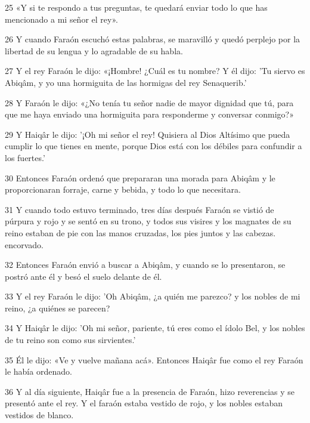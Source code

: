 \par 25 «Y si te respondo a tus preguntas, te quedará enviar todo lo que has mencionado a mi señor el rey».

\par 26 Y cuando Faraón escuchó estas palabras, se maravilló y quedó perplejo por la libertad de su lengua y lo agradable de su habla.

\par 27 Y el rey Faraón le dijo: «¡Hombre! ¿Cuál es tu nombre? Y él dijo: 'Tu siervo es Abiqâm, y yo una hormiguita de las hormigas del rey Senaquerib.'

\par 28 Y Faraón le dijo: «¿No tenía tu señor nadie de mayor dignidad que tú, para que me haya enviado una hormiguita para responderme y conversar conmigo?»

\par 29 Y Haiqâr le dijo: '¡Oh mi señor el rey! Quisiera al Dios Altísimo que pueda cumplir lo que tienes en mente, porque Dios está con los débiles para confundir a los fuertes.'

\par 30 Entonces Faraón ordenó que prepararan una morada para Abiqâm y le proporcionaran forraje, carne y bebida, y todo lo que necesitara.

\par 31 Y cuando todo estuvo terminado, tres días después Faraón se vistió de púrpura y rojo y se sentó en su trono, y todos sus visires y los magnates de su reino estaban de pie con las manos cruzadas, los pies juntos y las cabezas. encorvado.

\par 32 Entonces Faraón envió a buscar a Abiqâm, y cuando se lo presentaron, se postró ante él y besó el suelo delante de él.

\par 33 Y el rey Faraón le dijo: 'Oh Abiqâm, ¿a quién me parezco? y los nobles de mi reino, ¿a quiénes se parecen?

\par 34 Y Haiqâr le dijo: 'Oh mi señor, pariente, tú eres como el ídolo Bel, y los nobles de tu reino son como sus sirvientes.'

\par 35 Él le dijo: «Ve y vuelve mañana acá». Entonces Haiqâr fue como el rey Faraón le había ordenado.

\par 36 Y al día siguiente, Haiqâr fue a la presencia de Faraón, hizo reverencias y se presentó ante el rey. Y el faraón estaba vestido de rojo, y los nobles estaban vestidos de blanco.

